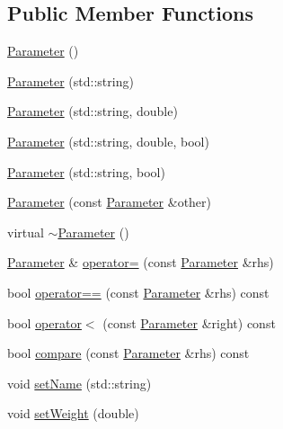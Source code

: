 \subsection*{Public Member Functions}
\begin{DoxyCompactItemize}
\item 
\mbox{\hyperlink{classanen_par_1_1_parameter_aada3139ee9b50c2acb90d275c72da550}{Parameter}} ()
\item 
\mbox{\hyperlink{classanen_par_1_1_parameter_ae60c28faa4a7dafc4b1c10df2a14893d}{Parameter}} (std\+::string)
\item 
\mbox{\hyperlink{classanen_par_1_1_parameter_a1f69783ced66d2fe01414e724cabe7c6}{Parameter}} (std\+::string, double)
\item 
\mbox{\hyperlink{classanen_par_1_1_parameter_a2c0360abe051ca5ca67d812f75987918}{Parameter}} (std\+::string, double, bool)
\item 
\mbox{\hyperlink{classanen_par_1_1_parameter_ac5eef55d40acfe03a9a741c5606ef0fc}{Parameter}} (std\+::string, bool)
\item 
\mbox{\hyperlink{classanen_par_1_1_parameter_af9f49a6e54e55e223f14ed4603a49d3a}{Parameter}} (const \mbox{\hyperlink{classanen_par_1_1_parameter}{Parameter}} \&other)
\item 
virtual \mbox{\hyperlink{classanen_par_1_1_parameter_a4077d3eb003469c95671d9f747bb3306}{$\sim$\+Parameter}} ()
\item 
\mbox{\hyperlink{classanen_par_1_1_parameter}{Parameter}} \& \mbox{\hyperlink{classanen_par_1_1_parameter_aebba3af3376eb06f763e3b6d46e68b56}{operator=}} (const \mbox{\hyperlink{classanen_par_1_1_parameter}{Parameter}} \&rhs)
\item 
bool \mbox{\hyperlink{classanen_par_1_1_parameter_a37147dfe637ea7387c4de651e7382606}{operator==}} (const \mbox{\hyperlink{classanen_par_1_1_parameter}{Parameter}} \&rhs) const
\item 
bool \mbox{\hyperlink{classanen_par_1_1_parameter_ab7997cdf149d06b8649754dab02ea4dc}{operator$<$}} (const \mbox{\hyperlink{classanen_par_1_1_parameter}{Parameter}} \&right) const
\item 
bool \mbox{\hyperlink{classanen_par_1_1_parameter_ac7bf17c016c65c6eba495a75cacf5431}{compare}} (const \mbox{\hyperlink{classanen_par_1_1_parameter}{Parameter}} \&rhs) const
\item 
void \mbox{\hyperlink{classanen_par_1_1_parameter_a273b15764bdfae1014bccb2cd4ac42a9}{set\+Name}} (std\+::string)
\item 
void \mbox{\hyperlink{classanen_par_1_1_parameter_acee344040fad3068f321c5fdf6b29cfe}{set\+Weight}} (double)

\end{DoxyCompactItemize}
